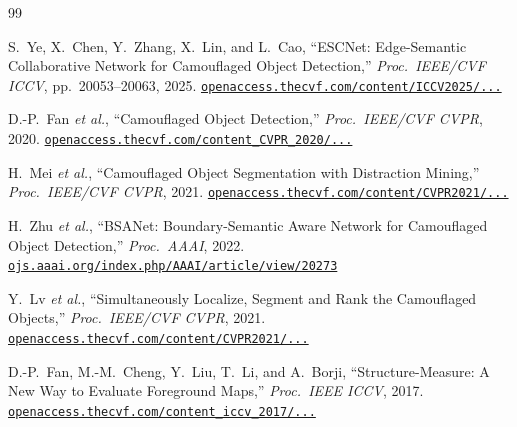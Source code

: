 \documentclass[12pt,a4paper]{report}
\begin{document}
\appendix



\begin{thebibliography}{99}

S.~Ye, X.~Chen, Y.~Zhang, X.~Lin, and L.~Cao,
``ESCNet: Edge-Semantic Collaborative Network for Camouflaged Object Detection,''
\textit{Proc.\ IEEE/CVF ICCV}, pp.~20053--20063, 2025.
\newline \href{https://openaccess.thecvf.com/content/ICCV2025/papers/Ye_ESCNet_Edge_Semantic_Collaborative_Network_for_Camouflaged_Object_Detection_ICCV_2025_paper.pdf}{\texttt{openaccess.thecvf.com/content/ICCV2025/...}}

D.-P.~Fan \textit{et al.},
``Camouflaged Object Detection,''
\textit{Proc.\ IEEE/CVF CVPR}, 2020.
\newline \href{https://openaccess.thecvf.com/content_CVPR_2020/papers/Fan_Camouflaged_Object_Detection_CVPR_2020_paper.pdf}{\texttt{openaccess.thecvf.com/content\_CVPR\_2020/...}}

H.~Mei \textit{et al.},
``Camouflaged Object Segmentation with Distraction Mining,''
\textit{Proc.\ IEEE/CVF CVPR}, 2021.
\newline \href{https://openaccess.thecvf.com/content/CVPR2021/papers/Mei_Camouflaged_Object_Segmentation_With_Distraction_Mining_CVPR_2021_paper.pdf}{\texttt{openaccess.thecvf.com/content/CVPR2021/...}}

H.~Zhu \textit{et al.},
``BSANet: Boundary-Semantic Aware Network for Camouflaged Object Detection,''
\textit{Proc.\ AAAI}, 2022.
\newline \href{https://ojs.aaai.org/index.php/AAAI/article/view/20273}{\texttt{ojs.aaai.org/index.php/AAAI/article/view/20273}}

Y.~Lv \textit{et al.},
``Simultaneously Localize, Segment and Rank the Camouflaged Objects,''
\textit{Proc.\ IEEE/CVF CVPR}, 2021.
\newline \href{https://openaccess.thecvf.com/content/CVPR2021/papers/Lv_Simultaneously_Localize_Segment_and_Rank_the_Camouflaged_Objects_CVPR_2021_paper.pdf}{\texttt{openaccess.thecvf.com/content/CVPR2021/...}}

D.-P.~Fan, M.-M.~Cheng, Y.~Liu, T.~Li, and A.~Borji,
``Structure-Measure: A New Way to Evaluate Foreground Maps,''
\textit{Proc.\ IEEE ICCV}, 2017.
\newline \href{https://openaccess.thecvf.com/content_iccv_2017/html/Fan_Structure-Measure_A_New_ICCV_2017_paper.html}{\texttt{openaccess.thecvf.com/content\_iccv\_2017/...}}


\end{thebibliography}
\end{document}
